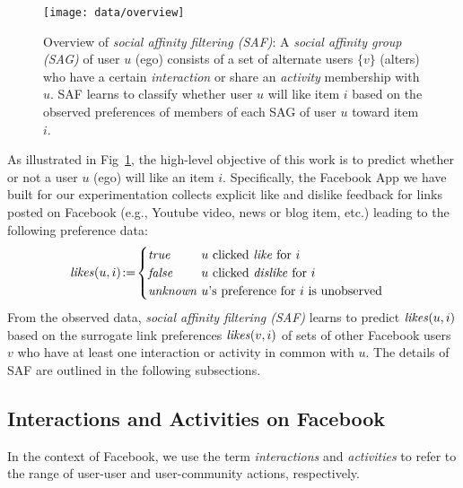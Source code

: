 
\begin{figure}[t!]
\centering
\texttt{[image: data/overview]}
\caption{Overview of \emph{social affinity filtering (SAF)}: A
  \emph{social affinity group (SAG)} of user $u$ (ego) consists of a
  set of alternate users $\{ v \}$ (alters) who have a certain
  \emph{interaction} or share an \emph{activity} membership with $u$.
  SAF learns to classify whether user $u$ will like item $i$ based on
  the observed preferences of members of each SAG of user $u$
  toward item $i$.}
\label{fig:overview}
\end{figure}

As illustrated in Fig~\ref{fig:overview}, the high-level objective of
this work is to predict whether or not a user $u$ (ego) will like an item
$i$.  Specifically, the Facebook App
we have built for our experimentation collects explicit like and
dislike feedback for links posted on Facebook
(e.g., Youtube video, news or blog item, etc.) leading to the following
preference data:
\begin{align*}
\like(u,i) & \! := \! 
          \begin{cases}
	  \true    \!\! & \!\! \text{$u$ clicked \emph{like} for $i$}\\
	  \false   \!\! & \!\! \text{$u$ clicked \emph{dislike} for $i$}\\
          \unknown \!\! & \!\! \text{$u$'s preference for $i$ is unobserved}
	  \end{cases}
\end{align*}
From the observed data, \emph{social affinity filtering (SAF)}
learns to predict $\like(u,i)$ based on the surrogate link
preferences $\like(v,i)$ of sets of other Facebook users $v$ who have
at least one interaction or activity in common with $u$.  The details
of SAF are outlined in the following subsections.

\subsection{Interactions and Activities on Facebook}

In the context of Facebook, we use the term {\em interactions} and
{\em activities} to refer to the range of user-user and user-community
actions, respectively.


